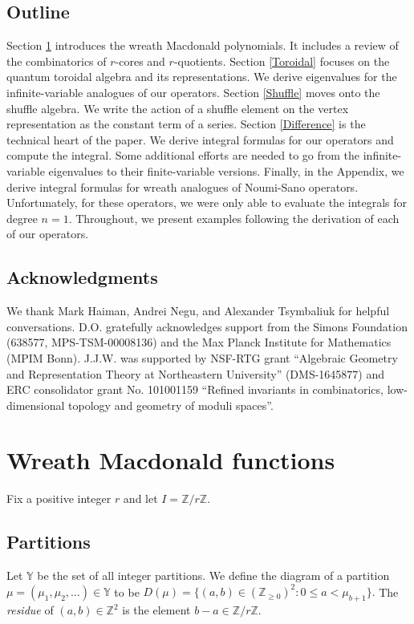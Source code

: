 \documentclass{amsart}
\newcommand{\Z}{\mathbb{Z}}
\newcommand{\Y}{\mathbb{Y}}
\theoremstyle{remark}
\numberwithin{thm}{section}
\numberwithin{equation}{section}
\begin{document}
\subsection{Outline}
Section \ref{Wreath} introduces the wreath Macdonald polynomials.
It includes a review of the combinatorics of $r$-cores and $r$-quotients.
Section \ref{Toroidal} focuses on the quantum toroidal algebra and its representations.
We derive eigenvalues for the infinite-variable analogues of our operators.
Section \ref{Shuffle} moves onto the shuffle algebra.
We write the action of a shuffle element on the vertex representation as the constant term of a series.
Section \ref{Difference} is the technical heart of the paper.
We derive integral formulas for our operators and compute the integral.
Some additional efforts are needed to go from the infinite-variable eigenvalues to their finite-variable versions.
Finally, in the Appendix, we derive integral formulas for wreath analogues of Noumi-Sano operators.
Unfortunately, for these operators, we were only able to evaluate the integrals for degree $n=1$.
Throughout, we present examples following the derivation of each of our operators.

\subsection{Acknowledgments}
We thank Mark Haiman, Andrei Negu, and Alexander Tsymbaliuk for helpful conversations. 
D.O. gratefully acknowledges support from the Simons Foundation (638577, MPS-TSM-00008136) and the Max Planck Institute for Mathematics (MPIM Bonn). 
J.J.W. was supported by NSF-RTG grant ``Algebraic Geometry and Representation Theory at Northeastern University'' (DMS-1645877) and ERC consolidator grant No. 101001159 ``Refined invariants in combinatorics, low-dimensional topology and geometry of moduli spaces''.

\section{Wreath Macdonald functions}\label{Wreath}

Fix a positive integer $r$ and let $I=\Z/r\Z$.
	
\subsection{Partitions}
Let $\Y$ be the set of all integer partitions. We define the diagram of a partition $\mu=(\mu_1,\mu_2,\dotsc)\in \Y$ to be $D(\mu)=\{(a,b)\in\left(\Z_{\ge0}\right)^2 : 0 \le a < \mu_{b+1} \}.$ The \emph{residue} of $(a,b)\in\Z^2$ is the element $b-a\in \Z/r\Z$. 
\end{document}

